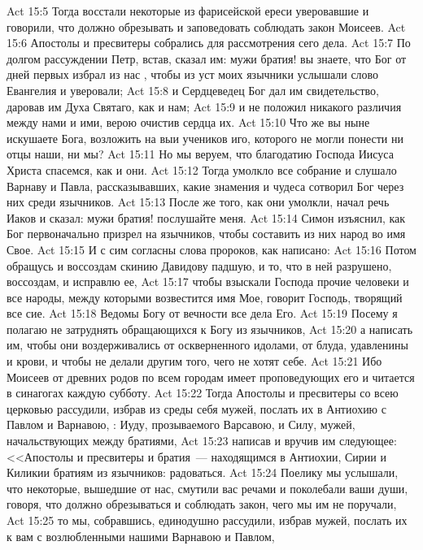 \vs Act 15:5 Тогда восстали некоторые из фарисейской ереси уверовавшие и говорили, что должно обрезывать  и заповедовать соблюдать закон Моисеев.
\rsbpar\vs Act 15:6 Апостолы и пресвитеры собрались для рассмотрения сего дела.
\vs Act 15:7 По долгом рассуждении Петр, встав, сказал им: мужи братия! вы знаете, что Бог от дней первых избрал из нас , чтобы из уст моих язычники услышали слово Евангелия и уверовали;
\vs Act 15:8 и Сердцеведец Бог дал им свидетельство, даровав им Духа Святаго, как и нам;
\vs Act 15:9 и не положил никакого различия между нами и ими, верою очистив сердца их.
\vs Act 15:10 Что же вы ныне искушаете Бога,  возложить на выи учеников иго, которого не могли понести ни отцы наши, ни мы?
\vs Act 15:11 Но мы веруем, что благодатию Господа Иисуса Христа спасемся, как и они.
\vs Act 15:12 Тогда умолкло все собрание и слушало Варнаву и Павла, рассказывавших, какие знамения и чудеса сотворил Бог через них среди язычников.
\vs Act 15:13 После же того, как они умолкли, начал речь Иаков и сказал: мужи братия! послушайте меня.
\vs Act 15:14 Симон изъяснил, как Бог первоначально призрел на язычников, чтобы составить из них народ во имя Свое.
\vs Act 15:15 И с сим согласны слова пророков, как написано:
\vs Act 15:16 Потом обращусь и воссоздам скинию Давидову падшую, и то, что в ней разрушено, воссоздам, и исправлю ее,
\vs Act 15:17 чтобы взыскали Господа прочие человеки и все народы, между которыми возвестится имя Мое, говорит Господь, творящий все сие.
\vs Act 15:18 Ведомы Богу от вечности все дела Его.
\vs Act 15:19 Посему я полагаю не затруднять обращающихся к Богу из язычников,
\vs Act 15:20 а написать им, чтобы они воздерживались от оскверненного идолами, от блуда, удавленины и крови, и чтобы не делали другим того, чего не хотят себе.
\vs Act 15:21 Ибо  Моисеев от древних родов по всем городам имеет проповедующих его и читается в синагогах каждую субботу.
\rsbpar\vs Act 15:22 Тогда Апостолы и пресвитеры со всею церковью рассудили, избрав из среды себя мужей, послать их в Антиохию с Павлом и Варнавою, : Иуду, прозываемого Варсавою, и Силу, мужей, начальствующих между братиями,
\vs Act 15:23 написав и вручив им следующее: <<Апостолы и пресвитеры и братия~--- находящимся в Антиохии, Сирии и Киликии братиям из язычников: радоваться.
\vs Act 15:24 Поелику мы услышали, что некоторые, вышедшие от нас, смутили вас  речами и поколебали ваши души, говоря, что должно обрезываться и соблюдать закон, чего мы им не поручали,
\vs Act 15:25 то мы, собравшись, единодушно рассудили, избрав мужей, послать их к вам с возлюбленными нашими Варнавою и Павлом,
